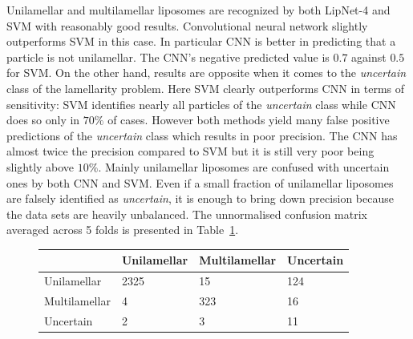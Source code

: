 \documentclass[a4paper, 11pt, table]{article}
\begin{document}
Unilamellar and multilamellar liposomes are recognized by both LipNet-4 and SVM with reasonably good results. Convolutional neural network slightly outperforms SVM in this case. In particular CNN is better in predicting that a particle is not unilamellar. The CNN's negative predicted value is $0.7$ against $0.5$ for SVM. On the other hand, results are opposite when it comes to the \textit{uncertain} class of the lamellarity problem. Here SVM clearly outperforms CNN in terms of sensitivity: SVM identifies nearly all particles of the \textit{uncertain} class while CNN does so only in $70\%$ of cases. However both methods yield many false positive predictions of the \textit{uncertain} class which results in poor precision. The CNN has almost twice the precision compared to SVM but it is still very poor being slightly above $10\%$. Mainly unilamellar liposomes are confused with uncertain ones by both CNN and SVM. Even if a small fraction of unilamellar liposomes are falsely identified as \textit{uncertain}, it is enough to bring down precision because the data sets are heavily unbalanced. The unnormalised confusion matrix averaged across 5 folds is presented in Table~\ref{table:cnn_lamellarity_cf_not_normalized}. 

\begin{figure}[H]
\centering
{}
\label{table:cnn_lamellarity_cf_not_normalized}
\begin{tabular}{|L{2.5cm} |C{2.5cm} |C{2.5cm} |C{2.5cm}|}
\toprule
 & Unilamellar & Multilamellar & Uncertain \\
\midrule
Unilamellar & 2325 & 15 & 124 \\
Multilamellar & 4 & 323 & 16 \\
Uncertain & 2 & 3 & 11 \\
\bottomrule
\end{tabular}
\end{figure}
\end{document}
